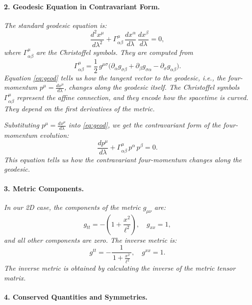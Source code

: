 \paragraph{2. Geodesic Equation in Contravariant Form.}

\textit{The standard geodesic equation is:}
\begin{equation}\label{eq:geod}
\frac{d^2 x^\mu}{d\lambda^2}
+ \Gamma^\mu_{\alpha\beta}\,\frac{dx^\alpha}{d\lambda}\,\frac{dx^\beta}{d\lambda}
= 0,
\end{equation}
\textit{where \(\Gamma^\mu_{\alpha\beta}\) are the Christoffel symbols. They are computed from}
\begin{equation}\label{eq:christoffel}
\Gamma^\mu_{\alpha\beta}
= \frac{1}{2}\,g^{\mu\sigma}
\bigl(\partial_\alpha g_{\sigma\beta}
+ \partial_\beta g_{\sigma\alpha}
- \partial_\sigma g_{\alpha\beta}\bigr).
\end{equation}
\textit{Equation \eqref{eq:geod} tells us how the tangent vector to the geodesic, i.e., the four-momentum \(p^\mu = \frac{dx^\mu}{d\lambda}\), changes along the geodesic itself. The Christoffel symbols \(\Gamma^\mu_{\alpha\beta}\) represent the affine connection, and they encode how the spacetime is curved. They depend on the first derivatives of the metric.}

\textit{Substituting \(p^\mu = \frac{dx^\mu}{d\lambda}\) into \eqref{eq:geod}, we get the contravariant form of the four-momentum evolution:}
\begin{equation}
\frac{dp^\mu}{d\lambda}
+ \Gamma^\mu_{\alpha\beta}\,p^\alpha\,p^\beta
= 0.
\end{equation}
\textit{This equation tells us how the contravariant four-momentum changes along the geodesic.}

\paragraph{3. Metric Components.}

\textit{In our 2D case, the components of the metric \(g_{\mu\nu}\) are:}
\[
g_{tt} = -\left(1 + \frac{x^2}{\ell^2}\right),
\quad
g_{xx} = 1,
\]
\textit{and all other components are zero. The inverse metric is:}
\[
g^{tt}
= -\frac{1}{\,1 + \frac{x^2}{\ell^2}\,},
\quad
g^{xx}
= 1.
\]
\textit{The inverse metric is obtained by calculating the inverse of the metric tensor matrix.}

\paragraph{4. Conserved Quantities and Symmetries.}

